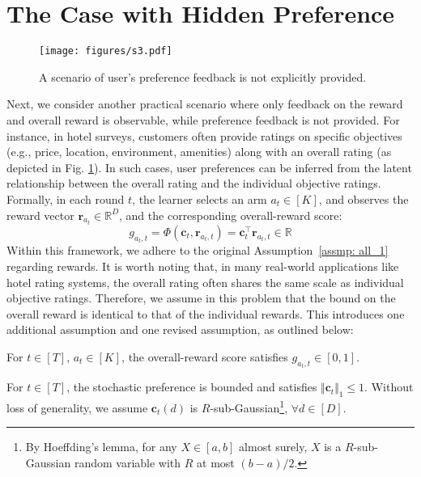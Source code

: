 \section{The Case with Hidden Preference}
\label{sec: hidden}

\begin{figure}[t]
\begin{center}
\centerline{\texttt{[image: figures/s3.pdf]}}
\end{center}
\vskip -0.2in
\caption{A scenario of user's preference feedback is not explicitly provided.}
\label{fig: s3}
\end{figure}

Next, we consider another practical scenario where only feedback on the reward and overall reward is observable, while preference feedback is not provided. For instance, in hotel surveys, customers often provide ratings on specific objectives (e.g., price, location, environment, amenities) along with an overall rating (as depicted in Fig. \ref{fig: s3}). In such cases, user preferences can be inferred from the latent relationship between the overall rating and the individual objective ratings.
Formally, in each round $t$, the learner selects an arm $a_t \!\in\! [K]$, and observes the reward vector $\boldsymbol{r}_{a_t} \!\in\! \mathbb{R}^{D}$, and the corresponding overall-reward score:
\begin{equation}
\label{eq:g_at}
\textstyle
g_{a_t,t} = \Phi(\boldsymbol{c}_t, \boldsymbol{r}_{a_t, t}) = \boldsymbol{c}_t^{\top} \boldsymbol{r}_{a_t, t} \in \mathbb{R}
\end{equation}
Within this framework, we adhere to the original Assumption~\ref{assmp: all_1} regarding rewards. It is worth noting that, in many real-world applications like hotel rating systems, the overall rating often shares the same scale as individual objective ratings.  
Therefore, we assume in this problem that the bound on the overall reward is identical to that of the individual rewards. This introduces one additional assumption and one revised assumption, as outlined below:
\begin{assumption}
\label{assmp: hpm_2}
For $t \in [T]$, $a_t \in [K]$, the overall-reward score satisfies 
$g_{a_t,t} \in [0,1]$.
\end{assumption}

\begin{assumption}
\label{assmp: hpm_3}
For $t \in [T]$, the stochastic preference is bounded and satisfies $\Vert \boldsymbol{c}_t \Vert_1 \leq 1$. Without loss of generality, we assume $\boldsymbol{c}_t(d)$ is $R$-sub-Gaussian\footnote{By Hoeffding’s lemma, for any $X \in [a,b]$ almost surely, $X$ is a $R$-sub-Gaussian random variable with $R$ at most $(b-a)/2$.}, $\forall d \in [D]$.
\end{assumption}


